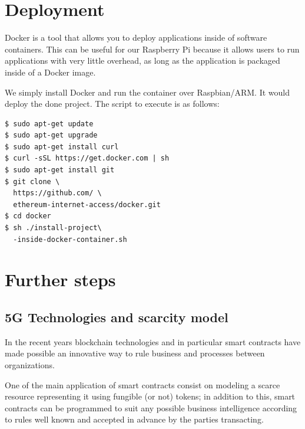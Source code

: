 \documentclass[12pt]{amsart}
\begin{document}
\begin{multicols}{2}
\section{Deployment}\label{sec:deploy}

\vspace{0.35cm}

Docker is a tool that allows you to deploy applications
inside of software containers. This can be useful for our
Raspberry Pi because it allows users to run applications with
very little overhead, as long as the application
is packaged inside of a Docker image.

\vspace{0.35cm}

We simply install Docker and run the container over Raspbian/ARM.
It would deploy the done project. The script to execute is as follows:

\begin{verbatim}
$ sudo apt-get update
$ sudo apt-get upgrade
$ sudo apt-get install curl
$ curl -sSL https://get.docker.com | sh
$ sudo apt-get install git
$ git clone \
  https://github.com/ \
  ethereum-internet-access/docker.git
$ cd docker
$ sh ./install-project\
  -inside-docker-container.sh
\end{verbatim}





\section{Further steps}

\subsection{5G Technologies and scarcity model}
\vspace{0.35cm}

In the recent years blockchain technologies
and in particular smart contracts have made possible
an innovative way to rule business and
processes between organizations.

\vspace{0.35cm}

One of the main application of smart contracts
consist on modeling a scarce resource representing
it using fungible (or not) tokens; in addition
to this, smart contracts can be programmed
to suit any possible business intelligence
according to rules well known and accepted
in advance by the parties transacting.


\end{multicols}
\end{document}
